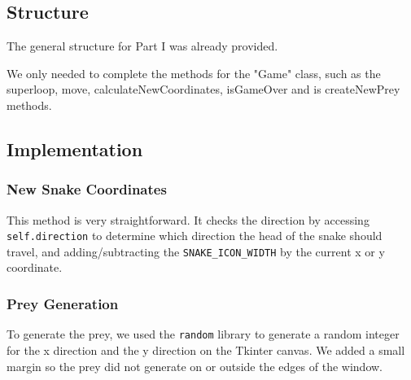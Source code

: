 \documentclass{article}
\begin{document}
\subsection{Structure}


The general structure for Part I was already provided.


We only needed to complete the methods for the "Game" class, such as the superloop, move, calculateNewCoordinates, isGameOver and is createNewPrey methods.

\subsection{Implementation}

\subsubsection{New Snake Coordinates}
This method is very straightforward. It checks the direction by accessing \texttt{self.direction} to determine which direction the head of the snake should travel, and adding/subtracting the \texttt{SNAKE\_ICON\_WIDTH} by the current x or y coordinate.

\subsubsection{Prey Generation}
To generate the prey, we used the \texttt{random} library to generate a random integer for the x direction and the y direction on the Tkinter canvas. We added a small margin so the prey did not generate on or outside the edges of the window.
\end{document}
